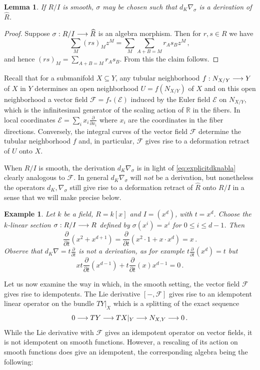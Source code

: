 \documentclass[english,letter paper,12pt,leqno]{article}
\newtheorem{lemma}[theorem]{Lemma}
\theoremstyle{example}
\newtheorem{example}[theorem]{Example}
\numberwithin{equation}{section}
\begin{document}
\begin{lemma} If $R/I$ is smooth, $\sigma$ may be chosen such that $d_K \nabla_\sigma$ is a derivation of $\widehat{R}$.
\end{lemma}
\begin{proof}
Suppose $\sigma: R/I \longrightarrow \widehat{R}$ is an algebra morphism. Then for $r,s \in R$ we have
\[
\sum_M (rs)_M z^M = \sum_M \sum_{A + B = M} r_As_B z^M\,,
\]
and hence $(rs)_M = \sum_{A+B = M} r_A s_B$. From this the claim follows.
\end{proof}

Recall that for a submanifold $X \subseteq Y$, any tubular neighborhood $f: N_{X/Y} \longrightarrow Y$ of $X$ in $Y$ determines an open neighborhood $U = f(N_{X/Y})$ of $X$ and on this open neighborhood a vector field $\mathscr{F} = f_*(\mathscr{E})$ induced by the Euler field $\mathscr{E}$ on $N_{X/Y}$, which is the infinitesimal generator of the scaling action of $\mathbb{R}$ in the fibers. In local coordinates $\mathscr{E} = \sum_i x_i \frac{\partial}{\partial x_i}$ where $x_i$ are the coordinates in the fiber directions. Conversely, the integral curves of the vector field $\mathscr{F}$ determine the tubular neighborhood $f$ \cite[\S 2.3]{burs} and, in particular, $\mathscr{F}$ gives rise to a deformation retract of $U$ onto $X$.

When $R/I$ is smooth, the derivation $d_K \nabla_\sigma$ is in light of \eqref{eq:explicitdknabla} clearly analogous to $\mathscr{F}$. In general $d_K \nabla_\sigma$ will \emph{not} be a derivation, but nonetheless the operators $d_K, \nabla_\sigma$ still give rise to a deformation retract of $\widehat{R}$ onto $R/I$ in a sense that we will make precise below.

\begin{example} Let $k$ be a field, $R = k[x]$ and $I = (x^d)$, with $t = x^d$. Choose the $k$-linear section $\sigma: R/I \longrightarrow R$ defined by $\sigma(x^i) = x^i$ for $0 \le i \le d - 1$. Then
\[
\frac{\partial}{\partial t}( x^2 + x^{d+1} ) = \frac{\partial}{\partial t}( x^2 \cdot 1 + x \cdot x^d ) = x\,.
\]
Observe that $d_K \nabla = t \frac{\partial}{\partial t}$ is \emph{not} a derivation, as for example $t\frac{\partial}{\partial t}( x^d ) = t$ but
\[
x t \frac{\partial}{\partial t}(x^{d-1}) + t \frac{\partial}{\partial t}(x) x^{d-1} = 0\,.
\]
\end{example}

Let us now examine the way in which, in the smooth setting, the vector field $\mathscr{F}$ gives rise to idempotents. The Lie derivative $[-, \mathscr{F}]$ gives rise to an idempotent linear operator on the bundle $TY|_X$ which is a splitting of the exact sequence 
\[
0 \longrightarrow TY \longrightarrow TX|_Y \longrightarrow N_{X,Y} \longrightarrow 0\,.
\]
While the Lie derivative with $\mathscr{F}$ gives an idempotent operator on vector fields, it is not idempotent on smooth functions. However, a rescaling of its action on smooth functions does give an idempotent, the corresponding algebra being the following:
\end{document}
